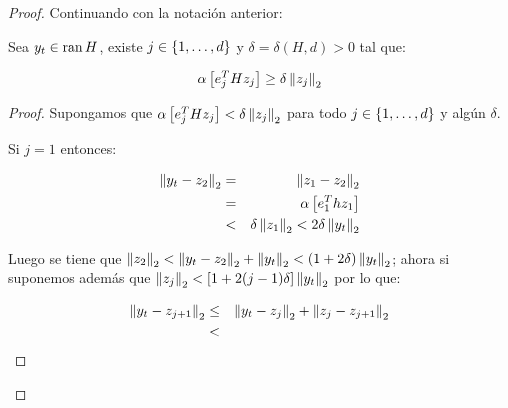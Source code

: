 \begin{proof}
	Continuando con la notaci\'on anterior:
	
	\begin{claim}
		\label{afirmacion1 : DC los puntos silla estrictos son fijos inestables}
		Sea $y_t \in \operatorname{ran}{H}$, existe $j \in \left\lbrace1, \dots, d\right\rbrace$ y $\delta = \delta(H, d) >0$ tal que:
		
		\begin{equation*}
			\alpha \left[e_j^T H z_j\right] \geq \delta \left\lVert z_j\right\rVert_2
		\end{equation*}
	\end{claim}


	\begin{proof}
		Supongamos que $\alpha \left[e_j^T H z_j\right] < \delta \left\lVert z_j\right\rVert_2$ para todo $j \in \left\lbrace1, \dots, d\right\rbrace$ y alg\'un $\delta$.
		
		Si $j = 1$ entonces:
		
		\begin{equation*}
			\begin{aligned}
				\left\lVert y_t - z_2\right\rVert_2 & = & \left\lVert z_1 - z_2\right\rVert_2 \\
				& = & \alpha \left[e_1^T hz_1\right] \\
				& < & \delta \left\lVert z_1\right\rVert_2 < 2 \delta \left\lVert y_t\right\rVert_2 
				\end{aligned}
		\end{equation*}
		
		
		Luego se tiene que $\left\lVert z_2\right\rVert_2 < \left\lVert y_t - z_2\right\rVert_2 + \left\lVert y_t\right\rVert_2 < (1 + 2\delta) \left\lVert y_t\right\rVert_2$; ahora si suponemos adem\'as que $\left\lVert z_j\right\rVert_2 < \left[1 + 2(j-1)\delta\right]\left\lVert y_t\right\rVert_2$ por lo que:
		
		\begin{equation*}
			\begin{aligned}
				\left\lVert y_t - z_{j+1}\right\rVert_2 & \leq & \left\lVert y_t - z_{j}\right\rVert_2 + \left\lVert z_j - z_{j+1}\right\rVert_2 \\
				& < & 
			\end{aligned}
		\end{equation*}
		
	\end{proof}
	
\end{proof}
